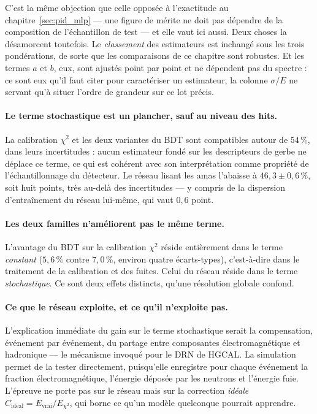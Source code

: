 C'est la même objection que celle opposée à l'exactitude au chapitre~\ref{sec:pid_mlp} — une figure de mérite ne doit pas dépendre de la composition de l'échantillon de test — et elle vaut ici aussi. Deux choses la désamorcent toutefois. Le \emph{classement} des estimateurs est inchangé sous les trois pondérations, de sorte que les comparaisons de ce chapitre sont robustes. Et les termes $a$ et $b$, eux, sont ajustés point par point et ne dépendent pas du spectre : ce sont eux qu'il faut citer pour caractériser un estimateur, la colonne $\sigma/E$ ne servant qu'à situer l'ordre de grandeur sur ce lot précis.

\paragraph{Le terme stochastique est un plancher, sauf au niveau des hits.} La calibration $\chi^2$ et les deux variantes du BDT sont compatibles autour de $54\,\%$, dans leurs incertitudes : aucun estimateur fondé sur les descripteurs de gerbe ne déplace ce terme, ce qui est cohérent avec son interprétation comme propriété de l'échantillonnage du détecteur. Le réseau lisant les amas l'abaisse à $46{,}3 \pm 0{,}6\,\%$, soit huit points, très au-delà des incertitudes --- y compris de la dispersion d'entraînement du réseau lui-même, qui vaut $0{,}6$ point.

\paragraph{Les deux familles n'améliorent pas le même terme.} L'avantage du BDT sur la calibration $\chi^2$ réside entièrement dans le terme \emph{constant} ($5{,}6\,\%$ contre $7{,}0\,\%$, environ quatre écarts-types), c'est-à-dire dans le traitement de la calibration et des fuites. Celui du réseau réside dans le terme \emph{stochastique}. Ce sont deux effets distincts, qu'une résolution globale confond.

\paragraph{Ce que le réseau exploite, et ce qu'il n'exploite pas.} L'explication immédiate du gain sur le terme stochastique serait la compensation, événement par événement, du partage entre composantes électromagnétique et hadronique — le mécanisme invoqué pour le DRN de HGCAL. La simulation permet de la tester directement, puisqu'elle enregistre pour chaque événement la fraction électromagnétique, l'énergie déposée par les neutrons et l'énergie fuie. L'épreuve ne porte pas sur le réseau mais sur la correction \emph{idéale} $C_{\mathrm{ideal}} = E_{\mathrm{vrai}}/E_{\chi^2}$, qui borne ce qu'un modèle quelconque pourrait apprendre.

